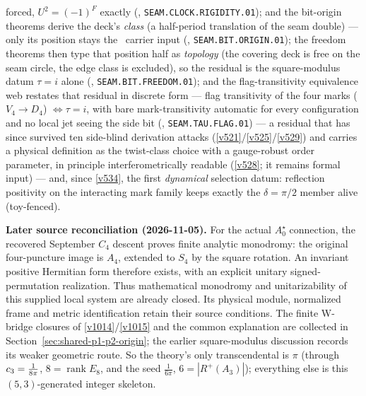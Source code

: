 \begin{keybox}[The whole integer skeleton from one pair $(\gcar,\Nfam)=(5,3)$ \mE\ (\veri{v53\_compiler\_core.py})]
forced, $U^2=(-1)^F$ exactly (, \texttt{SEAM.CLOCK.RIGIDITY.01});
and the bit-origin theorems derive the deck's \emph{class} (a half-period translation of the seam
double) --- only its position stays the \mC\ carrier input
(, \texttt{SEAM.BIT.ORIGIN.01}); the freedom theorems then type
that position half as \emph{topology} (the covering deck is free on the seam circle, the edge class
is excluded), so the residual is the square-modulus datum $\tau=i$ alone
(, \texttt{SEAM.BIT.FREEDOM.01}); and the flag-transitivity
equivalence web restates that residual in discrete form --- flag transitivity of the four marks
($V_4\to D_4$) $\iff\tau=i$, with bare mark-transitivity automatic for every configuration and no
local jet seeing the side bit (, \texttt{SEAM.TAU.FLAG.01}) ---
a residual that has since survived ten side-blind derivation attacks
(\vref{v521}/\vref{v525}/\vref{v529}) and carries a physical definition as the twist-class
choice with a gauge-robust order parameter, in principle interferometrically readable
(\vref{v528}; it remains formal input) --- and, since \vref{v534}, the first \emph{dynamical}
selection datum: reflection positivity on the interacting mark family keeps exactly the
$\delta=\pi/2$ member alive (toy-fenced).
\par\smallskip\noindent\textbf{Later source reconciliation (2026-11-05).}
For the actual $A_0^\star$ connection, the recovered September $C_4$ descent
proves finite analytic monodromy: the original four-puncture image is $A_4$,
extended to $S_4$ by the square rotation. An invariant positive Hermitian form
therefore exists, with an explicit unitary signed-permutation realization.
Thus mathematical monodromy and unitarizability of this supplied local system
are already closed. Its physical module, normalized frame and metric
identification retain their source conditions. The finite W-bridge closures
of \vref{v1014}/\vref{v1015} and the common explanation are collected in
Section~\ref{sec:shared-p1-p2-origin}; the earlier square-modulus discussion
records its weaker geometric route.
So the theory's only transcendental is $\pi$ (through
$c_3=\tfrac1{8\pi}$, $8=\operatorname{rank}E_8$, and the seed $\tfrac1{6\pi}$, $6=|R^+(A_3)|$);
everything else is this $(5,3)$-generated integer skeleton.
\end{keybox}

